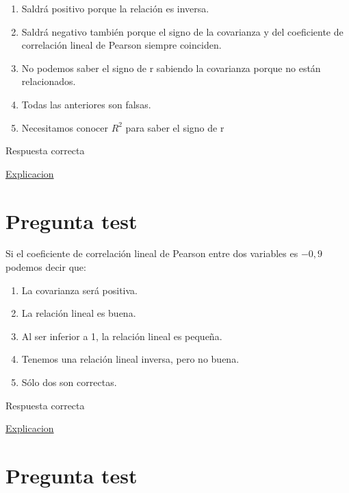 \documentclass[
]{book}
\providecommand{\tightlist}{%
  \setlength{\itemsep}{0pt}\setlength{\parskip}{0pt}}
\begin{document}
\begin{enumerate}
\def\labelenumi{\alph{enumi})}
\tightlist
\item
  Saldrá positivo porque la relación es inversa.
\item
  Saldrá negativo también porque el signo de la covarianza y del coeficiente de correlación lineal de Pearson siempre coinciden.
\item
  No podemos saber el signo de r sabiendo la covarianza porque no están relacionados.
\item
  Todas las anteriores son falsas.
\item
  Necesitamos conocer \(R^2\) para saber el signo de r
\end{enumerate}

Respuesta correcta

\href{https://1fjmanzano.github.io/bioestadistica/relaci\%C3\%B3n-entre-variables-nume\%CC\%81ricas.html\#covarianza}{Explicacion}

\hypertarget{pregunta-test-138}{%
\section{Pregunta test}\label{pregunta-test-138}}

Si el coeficiente de correlación lineal de Pearson entre dos variables es \(-0,9\) podemos decir que:

\begin{enumerate}
\def\labelenumi{\alph{enumi})}
\tightlist
\item
  La covarianza será positiva.
\item
  La relación lineal es buena.
\item
  Al ser inferior a 1, la relación lineal es pequeña.
\item
  Tenemos una relación lineal inversa, pero no buena.
\item
  Sólo dos son correctas.
\end{enumerate}

Respuesta correcta

\href{https://1fjmanzano.github.io/bioestadistica/relaci\%C3\%B3n-entre-variables-nume\%CC\%81ricas.html\#coeficiente-de-correlacio\%CC\%81n}{Explicacion}

\hypertarget{pregunta-test-139}{%
\section{Pregunta test}\label{pregunta-test-139}}
\end{document}
